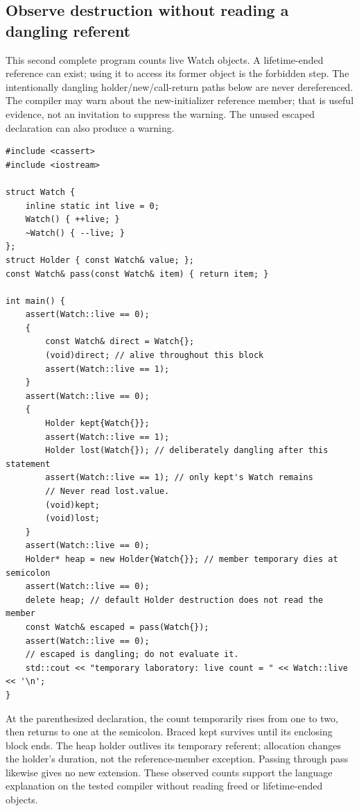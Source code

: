 \subsection{Observe destruction without reading a dangling referent}\label{05-engine-i-ch004-observe-destruction-without-reading-a-dangling-referent}

\hypertarget{05-engine-i-ch004-observe-destruction-without-reading-a-dangling-referent}{}

This second complete program counts live Watch objects. A lifetime-ended reference can exist; using it to access its former object is the forbidden step. The intentionally dangling holder/new/call-return paths below are never dereferenced. The compiler may warn about the new-initializer reference member; that is useful evidence, not an invitation to suppress the warning. The unused escaped declaration can also produce a warning.

\begin{verbatim}
#include <cassert>
#include <iostream>

struct Watch {
    inline static int live = 0;
    Watch() { ++live; }
    ~Watch() { --live; }
};
struct Holder { const Watch& value; };
const Watch& pass(const Watch& item) { return item; }

int main() {
    assert(Watch::live == 0);
    {
        const Watch& direct = Watch{};
        (void)direct; // alive throughout this block
        assert(Watch::live == 1);
    }
    assert(Watch::live == 0);
    {
        Holder kept{Watch{}};
        assert(Watch::live == 1);
        Holder lost(Watch{}); // deliberately dangling after this statement
        assert(Watch::live == 1); // only kept's Watch remains
        // Never read lost.value.
        (void)kept;
        (void)lost;
    }
    assert(Watch::live == 0);
    Holder* heap = new Holder{Watch{}}; // member temporary dies at semicolon
    assert(Watch::live == 0);
    delete heap; // default Holder destruction does not read the member
    const Watch& escaped = pass(Watch{});
    assert(Watch::live == 0);
    // escaped is dangling; do not evaluate it.
    std::cout << "temporary laboratory: live count = " << Watch::live << '\n';
}
\end{verbatim}

At the parenthesized declaration, the count temporarily rises from one to two, then returns to one at the semicolon. Braced kept survives until its enclosing block ends. The heap holder outlives its temporary referent; allocation changes the holder's duration, not the reference-member exception. Passing through pass likewise gives no new extension. These observed counts support the language explanation on the tested compiler without reading freed or lifetime-ended objects.

